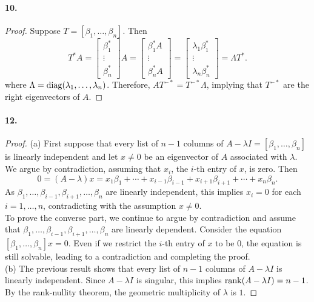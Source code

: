   \paragraph{10.}
  \begin{proof}
    Suppose $T=[\beta_1,\dots,\beta_n]$. Then
    \[
      T^*A = 
      \begin{bmatrix}
        \beta_1^* \\ \vdots \\ \beta_n^*
      \end{bmatrix}
      A =
      \begin{bmatrix}
        \beta_1^* A \\ \vdots \\ \beta_n^* A
      \end{bmatrix}
      =
      \begin{bmatrix}
        \lambda_1\beta_1^* \\ \vdots \\ \lambda_n\beta_n^*
      \end{bmatrix}
      = \Lambda T^*.
    \]
    where $\Lambda = \operatorname{diag}(\lambda_1,\dots,\lambda_n)$. Therefore, $AT^{-*}=
    T^{-*}\Lambda$, implying that $T^{-*}$ are the right eigenvectors of $A$.
  \end{proof}

  \paragraph{12.}
  \begin{proof}
    \noindent 
    (a) First suppose that every list of $n-1$ columns of $A-\lambda I=[\beta_1,
    \dots,\beta_n]$ is linearly independent and let $x\ne 0$ be an eigenvector 
    of $A$ associated with $\lambda$. We argue by contradiction, assuming that 
    $x_i$, the $i$-th entry of $x$, is zero. Then 
    \[
      0 = (A-\lambda)x = 
      x_1\beta_1 + \cdots + x_{i-1}\beta_{i-1} + x_{i+1}\beta_{i+1} + \cdots +
      x_n\beta_n.
    \]
    As $\beta_1,\dots,\beta_{i-1},\beta_{i+1},\dots,\beta_n$ are linearly 
    independent, this implies $x_i=0$ for each $i=1,\dots,n$, contradicting with
    the assumption $x\ne 0$. \\
    To prove the converse part, we continue to argue by contradiction and assume
    that $\beta_1,\dots,\beta_{i-1},\beta_{i+1},\dots,\beta_n$ are linearly 
    dependent. Consider the equation $[\beta_1,\dots,\beta_n]x = 0$. Even if we 
    restrict the $i$-th entry of $x$ to be $0$, the equation is still solvable,
    leading to a contradiction and completing the proof. \\
    (b) The previous result shows that every list of $n-1$ columns of $A-\lambda
    I$ is linearly independent. Since $A-\lambda I$ is singular, this implies
    $\operatorname{rank}(A-\lambda I)=n-1$. By the rank-nullity theorem, the geometric 
    multiplicity of $\lambda$ is $1$.
  \end{proof}

